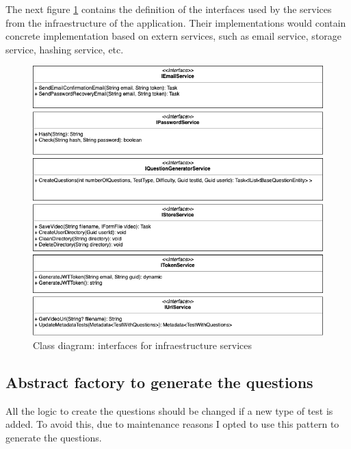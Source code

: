            \newpage
            The next figure \ref{fig:implementation_interfaces_2} contains the definition of the interfaces used by the services from the infraestructure of the application. Their implementations 
            would contain concrete implementation based on extern services, such as email service, storage service, hashing service, etc.
            \begin{figure}[H]
                \centering
                    \includegraphics[width=\textwidth]{assets/diagrams/interfaces_2.png}
                \caption{Class diagram: interfaces for infraestructure services}
                \label{fig:implementation_interfaces_2}
            \end{figure}

        \newpage
        \subsection{Abstract factory to generate the questions}
            All the logic to create the questions should be changed if a new type of test is added. 
            To avoid this, due to maintenance reasons I opted to use this pattern to generate the questions. 

